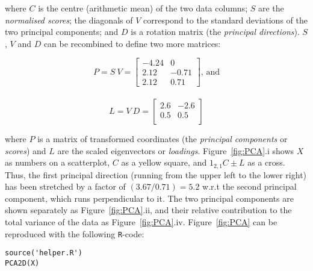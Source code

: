 \documentclass[11pt]{article}
\begin{document}
\begin{enumerate}
  \noindent where $C$ is the centre (arithmetic mean) of the two data
  columns; $S$ are the \emph{normalised scores}; the diagonals of $V$
  correspond to the standard deviations of the two principal components;
  and $D$ is a rotation matrix (the \emph{principal directions}). $S$,
  $V$ and $D$ can be recombined to define two more matrices:

  \begin{equation}
    P  = S~V =
    \left[
      \begin{array}{cc}
        -4.24 & 0 \\
        2.12 & -0.71 \\
        2.12 & 0.71
      \end{array}
      \right] \mbox{, and}\label{eq:P}
  \end{equation}\\
  
  \begin{equation} L = V~D  =
    \left[
      \begin{array}{cc}
        2.6 & -2.6 \\
        0.5 & 0.5 \\
      \end{array}
      \right]
    \label{eq:L}
  \end{equation}

  \noindent where $P$ is a matrix of transformed coordinates (the
  \emph{principal components} or \emph{scores}) and $L$ are the scaled
  eigenvectors or \emph{loadings}. Figure~\ref{fig:PCA}.i shows $X$ as
  numbers on a scatterplot, $C$ as a yellow square, and $1_{2,1}C \pm
  L$ as a cross. Thus, the first principal direction (running from the
  upper left to the lower right) has been stretched by a factor of
  $(3.67/0.71) = 5.2$ w.r.t the second principal component, which runs
  perpendicular to it. The two principal components are shown
  separately as Figure~\ref{fig:PCA}.ii, and their relative
  contribution to the total variance of the data as
  Figure~\ref{fig:PCA}.iv. Figure~\ref{fig:PCA} can be reproduced with
  the following \texttt{R}-code:

\begin{verbatim}
source('helper.R')
PCA2D(X)
\end{verbatim}


\end{enumerate}
\end{document}
